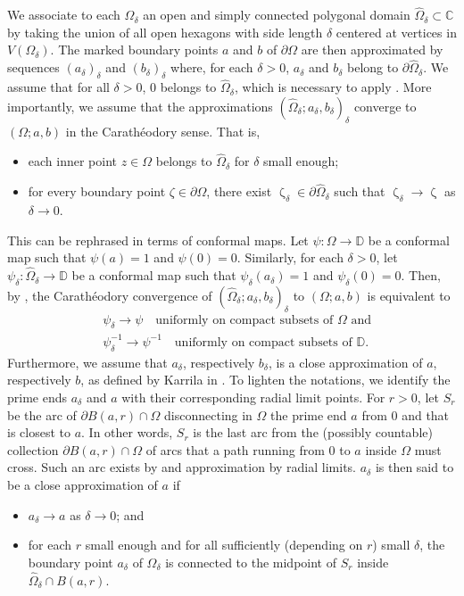 \documentclass{article}
\theoremstyle{definition}
\theoremstyle{remark}
\theoremstyle{remark}
\begin{document}
We associate to each $\Omega_{\delta}$ an open and simply connected polygonal domain
$\hat \Omega_{\delta} \subset \mathbb{C}$ by taking the union of all open hexagons with side length $\delta$ centered at vertices in $V(\Omega_{\delta})$. The marked boundary points $a$ and $b$ of $\partial \Omega$ are then approximated by sequences $(a_{\delta})_{\delta}$ and $(b_{\delta})_{\delta}$ where, for each $\delta >0$, $a_{\delta}$ and $b_{\delta}$ belong to $\partial \hat \Omega_{\delta}$. We assume that for all $\delta >0$, $0$ belongs to $\hat \Omega_{\delta}$, which is necessary to apply \cite[Theorem~4.2]{Karrila}. More importantly, we assume that the approximations $(\hat \Omega_{\delta}; a_{\delta}, b_{\delta})_{\delta}$ converge to $(\Omega; a, b)$ in the Carath\'eodory sense. That is,
\begin{itemize}
    \item each inner point $z \in \Omega$ belongs to $\hat \Omega_{\delta}$ for $\delta$ small enough;
    \item for every boundary point $\zeta \in \partial \Omega$, there exist $\upzeta_{\delta} \in \partial \hat \Omega_{\delta}$ such that $\upzeta_{\delta} \to \upzeta$ as $\delta \to 0$.
\end{itemize}
This can be rephrased in terms of conformal maps. Let $\psi: \Omega \to \mathbb{D}$ be a conformal map such that $\psi(a)=1$ and $\psi(0)=0$. Similarly, for each $\delta >0$, let $\psi_{\delta}: \hat \Omega_{\delta} \to \mathbb{D}$ be a conformal map such that $\psi_{\delta}(a_{\delta})=1$ and $\psi_{\delta}(0)=0$. Then, by \cite[Theorem~1.8]{Pommeranke}, the Carath\'eodory convergence of $(\hat \Omega_{\delta}; a_{\delta}, b_{\delta})_{\delta}$ to $(\Omega; a, b)$ is equivalent to
\begin{align*}
    & \psi_{\delta} \to \psi \quad \text{uniformly on compact subsets of $\Omega$ and}\\
    & \psi_{\delta}^{-1} \to \psi^{-1} \quad \text{uniformly on compact subsets of $\mathbb{D}$}.
\end{align*}
Furthermore, we assume that $a_{\delta}$, respectively $b_{\delta}$, is a close approximation of $a$, respectively $b$, as defined by Karrila in \cite[Section~4.3]{Karrila}. To lighten the notations, we identify the prime ends $a_{\delta}$ and $a$ with their corresponding radial limit points. For $r>0$, let $S_r$ be the arc of $\partial B(a,r) \cap \Omega$ disconnecting in $\Omega$ the prime end $a$ from $0$ and that is closest to $a$. In other words, $S_r$ is the last arc from the (possibly countable) collection $\partial B(a,r) \cap \Omega$ of arcs that a path running from $0$ to $a$ inside $\Omega$ must cross. Such an arc exists by \cite[Lemma~A.1]{Karrila} and approximation by radial limits. $a_{\delta}$ is then said to be a close approximation of $a$ if
\begin{itemize}
    \item $a_{\delta} \to a$ as $\delta \to 0$; and
    \item for each $r$ small enough and for all sufficiently (depending on $r$) small $\delta$, the boundary point $a_{\delta}$ of $\hat \Omega_{\delta}$ is connected to the midpoint of $S_r$ inside $\hat \Omega_{\delta} \cap B(a,r)$. 
\end{itemize}
\end{document}
